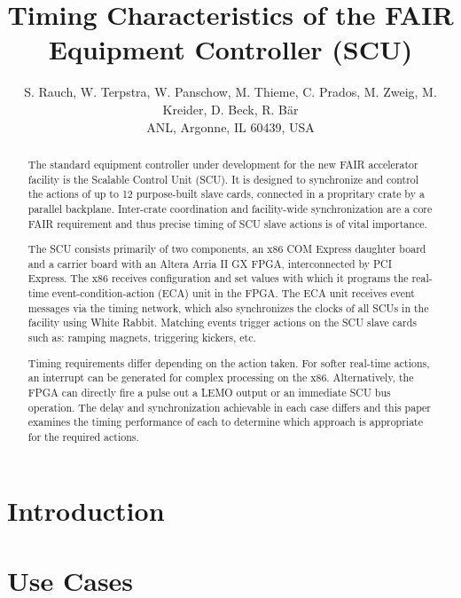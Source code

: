 \documentclass{JAC2003}
\begin{document}
\title{Timing Characteristics of the FAIR Equipment Controller (SCU)}

\author{
S. Rauch,
W. Terpstra,
W. Panschow,
M. Thieme,
C. Prados,
M. Zweig,
M. Kreider,
D. Beck,
R. B\"ar\\
ANL, Argonne, IL 60439, USA}

\maketitle

\begin{abstract}
The standard equipment controller under development for the new FAIR
accelerator facility is the Scalable Control Unit (SCU). It is designed to
synchronize and control the actions of up to 12 purpose-built slave cards,
connected in a propritary crate by a parallel backplane. Inter-crate
coordination and facility-wide synchronization are a core FAIR requirement
and thus precise timing of SCU slave actions is of vital importance.

The SCU consists primarily of two components, an x86 COM Express daughter
board and a carrier board with an Altera Arria II GX FPGA, interconnected by
PCI Express. The x86 receives configuration and set values with which it
programs the real-time event-condition-action (ECA) unit in the FPGA. The
ECA unit receives event messages via the timing network, which also
synchronizes the clocks of all SCUs in the facility using White Rabbit.
Matching events trigger actions on the SCU slave cards such as: ramping
magnets, triggering kickers, etc.

Timing requirements differ depending on the action taken. For softer
real-time actions, an interrupt can be generated for complex processing on
the x86. Alternatively, the FPGA can directly fire a pulse out a LEMO output
or an immediate SCU bus operation. The delay and synchronization achievable
in each case differs and this paper examines the timing performance of each
to determine which approach is appropriate for the required actions.
\end{abstract}

\section{Introduction}


\section{Use Cases}
\end{document}
